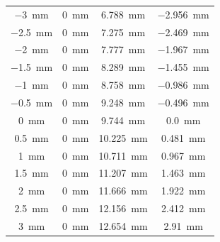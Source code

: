 \begin{table}[ht]
\begin{tabular}{| c | c | c | c |}
        \SI{-3}{mm}           & \SI{0}{mm}     & \SI{6.788}{mm}      & \SI{-2.956}{mm}   \\
        \SI{-2.5}{mm}         & \SI{0}{mm}     & \SI{7.275}{mm}      & \SI{-2.469}{mm}   \\
        \SI{-2}{mm}           & \SI{0}{mm}     & \SI{7.777}{mm}      & \SI{-1.967}{mm}   \\
        \SI{-1.5}{mm}         & \SI{0}{mm}     & \SI{8.289}{mm}      & \SI{-1.455}{mm}   \\
        \SI{-1}{mm}           & \SI{0}{mm}     & \SI{8.758}{mm}      & \SI{-0.986}{mm}   \\
        \SI{-0.5}{mm}         & \SI{0}{mm}     & \SI{9.248}{mm}      & \SI{-0.496}{mm}   \\
        \SI{0}{mm}            & \SI{0}{mm}     & \SI{9.744}{mm}      & \SI{0.0}{mm}      \\
        \SI{0.5}{mm}          & \SI{0}{mm}     & \SI{10.225}{mm}     & \SI{0.481}{mm}    \\
        \SI{1}{mm}            & \SI{0}{mm}     & \SI{10.711}{mm}     & \SI{0.967}{mm}    \\
        \SI{1.5}{mm}          & \SI{0}{mm}     & \SI{11.207}{mm}     & \SI{1.463}{mm}    \\
        \SI{2}{mm}            & \SI{0}{mm}     & \SI{11.666}{mm}     & \SI{1.922}{mm}    \\
        \SI{2.5}{mm}          & \SI{0}{mm}     & \SI{12.156}{mm}     & \SI{2.412}{mm}    \\
        \SI{3}{mm}            & \SI{0}{mm}     & \SI{12.654}{mm}     & \SI{2.91}{mm}     \\

        \hline



\end{tabular}
\end{table}
